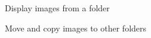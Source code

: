 \begin{changelog}
\item Display images from a folder
\item Move and copy images to other folders
\end{changelog}
